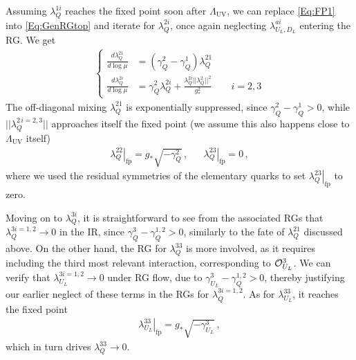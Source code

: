 \documentclass[aps,prl,twocolumn,showpacs,10pt,preprintnumbers,nofootinbib]{revtex4-2}
\newcommand{\gst}{g_*}
\newcommand{\fp}[1]{{\left.#1\right|_{\text{fp}}}}
\begin{document}
{Assuming $\lambda_{Q}^{1i}$ reaches the fixed point soon after $\Lambda_{\text{UV}}$, we can replace \eqref{Eq:FP1} into \eqref{Eq:GenRGtop} and iterate for $\lambda_Q^{2i}$, once again neglecting $\lambda_{U_L,D_L}^{ai}$ entering the RG. We get
\begin{align}
\begin{cases}
    \frac{d \lambda_{Q}^{2 1}}{ d \log \mu} &= (\gamma^2_Q-\gamma^1_Q) \lambda_Q^{21}\\
    \frac{d \lambda_{Q}^{2 i}}{ d \log \mu} &= \gamma_Q^2 \lambda_Q^{2i}+\frac{ \lambda_Q^{2i}||\lambda_Q^2||^2}{\gst^2} \quad\quad i=2,3
\end{cases}
\end{align}
The off-diagonal mixing $\lambda_{Q}^{21}$ is exponentially suppressed, since $\gamma_Q^2-\gamma_Q^1>0$, while $||\lambda_Q^{2\,i=2,3}||$ approaches itself the fixed point (we assume this also happens close to $\Lambda_{\text{UV}}$ itself)
\begin{align}\label{Eq:FPQ2}
   \fp{\lambda_Q^{22}} = \gst \sqrt{-\gamma_Q^2}\,, && \fp{\lambda_Q^{23}}=0\,,
\end{align}
where we used the residual symmetries of the elementary quarks to set $\fp{\lambda_Q^{23}}$ to zero. 

Moving on to $\lambda_Q^{3i}$, it is straightforward to see from the associated RGs that $\lambda_Q^{3i=1,2} \rightarrow 0$ in the IR, since $\gamma_Q^3 - \gamma_Q^{1,2} > 0$, similarly to the fate of $\lambda_Q^{21}$ discussed above. On the other hand, the RG for $\lambda_Q^{33}$ is more involved, as it requires including the third most relevant interaction, corresponding to ${\cal O}_{U_L}^3$. We can verify that $\lambda_{U_L}^{3i=1,2} \rightarrow 0$ under RG flow, due to $\gamma_{U_L}^3 - \gamma_Q^{1,2} > 0$, thereby justifying our earlier neglect of these terms in the RGs for $\lambda_Q^{3i=1,2}$. As for $\lambda_{U_L}^{33}$, it reaches the fixed point
\begin{align}\label{Eq:FPU3}
    \fp{\lambda_{U_L}^{33}} = \gst \sqrt{-\gamma_{U_L}^3}\,,
\end{align}
which in turn drives $\lambda_Q^{33} \rightarrow 0$.

}
\end{document}
